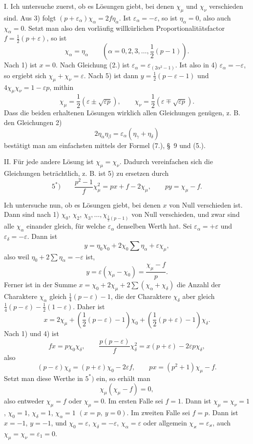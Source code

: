 \documentclass[11pt]{article}
\begin{document}
I. Ich untersuche zuerst, ob es Lösungen giebt, bei denen $\chi_\mu$ und $\chi_\nu$ verschieden sind. Aus 3) folgt $(p+\varepsilon_\alpha)\chi_\alpha=2f\eta_\alpha$. Ist $\varepsilon_\alpha=-\varepsilon$, so ist $\eta_\alpha=0$, also auch $\chi_\alpha=0$. Setzt man also den vorläufig willkürlichen Proportionalitätsfactor $f=\frac12(p+\varepsilon)$, so ist
\[
\chi_\alpha=\eta_\alpha\qquad\left(\alpha=0,2,3,\ldots,\frac12(p-1)\right).
\]
Nach 1) ist $x=0$. Nach Gleichung (2.) ist $\varepsilon_\alpha=\varepsilon_{(2\alpha^2-1)}$. Ist also in 4) $\varepsilon_\alpha=-\varepsilon$, so ergiebt sich $\chi_\mu+\chi_\nu=\varepsilon$. Nach 5) ist dann $y=\frac12(p-\varepsilon-1)$ und $4\chi_\mu\chi_\nu=1-\varepsilon p$, mithin
\[
\chi_\mu=\frac12(\varepsilon\pm\sqrt{\varepsilon p}),\qquad
\chi_\nu=\frac12(\varepsilon\mp\sqrt{\varepsilon p}).
\]
Dass die beiden erhaltenen Lösungen wirklich allen Gleichungen genügen, z. B. den Gleichungen 2)
\begin{equation*}\tag{8.}
2\eta_\alpha\eta_\beta=\varepsilon_\alpha(\eta_\gamma+\eta_\delta)
\end{equation*}
bestätigt man am einfachsten mittels der Formel (7.), \S~9 und (5.).

II. Für jede andere Lösung ist $\chi_\mu=\chi_\nu$. Dadurch vereinfachen sich die Gleichungen beträchtlich, z. B. ist 5) zu ersetzen durch
\[
5^*)\qquad
\frac{p^2-1}{f}\chi_\mu^2=px+f-2\chi_\mu,\qquad
py=\chi_\mu-f.
\]

Ich untersuche nun, ob es Lösungen giebt, bei denen $x$ von Null verschieden ist. Dann sind nach 1) $\chi_0$, $\chi_2$, $\chi_3,\ldots,\chi_{\frac12(p-1)}$ von Null verschieden, und zwar sind alle $\chi_\alpha$ einander gleich, für welche $\varepsilon_\alpha$ denselben Werth hat. Sei $\varepsilon_\alpha=+\varepsilon$ und $\varepsilon_\delta=-\varepsilon$. Dann ist
\[
y=\eta_0\chi_0+2\chi_0\sum\eta_\alpha+\varepsilon\chi_\mu,
\]
also weil $\eta_0+2\sum\eta_\alpha=-\varepsilon$ ist,
\[
y=\varepsilon(\chi_\mu-\chi_0)=\frac{\chi_\mu-f}{p}.
\]
Ferner ist in der Summe $x=\chi_0+2\chi_\mu+2\sum(\chi_\alpha+\chi_\delta)$ die Anzahl der Charaktere $\chi_\alpha$ gleich $\frac14(p-\varepsilon)-1$, die der Charaktere $\chi_\delta$ aber gleich $\frac14(p-\varepsilon)-\frac12(1-\varepsilon)$. Daher ist
\[
x=2\chi_\mu+\left(\frac12(p-\varepsilon)-1\right)\chi_0+
\left(\frac12(p+\varepsilon)-1\right)\chi_\delta.
\]
Nach 1) und 4) ist
\[
fx=p\chi_0\chi_\delta,\qquad
\frac{p(p-\varepsilon)}{f}\chi_\delta^2=x(p+\varepsilon)-2\varepsilon p\chi_\delta,
\]
also
\[
(p-\varepsilon)\chi_\delta=(p+\varepsilon)\chi_0-2\varepsilon f,\qquad
px=(p^2+1)\chi_\mu-f.
\]
Setzt man diese Werthe in $5^*)$ ein, so erhält man
\[
\chi_\mu(\chi_\mu-f)=0,
\]
also entweder $\chi_\mu=f$ oder $\chi_\mu=0$. Im ersten Falle sei $f=1$. Dann ist $\chi_\mu=\chi_\nu=1$, $\chi_0=1$, $\chi_\delta=1$, $\chi_\alpha=1$ $(x=p,\ y=0)$. Im zweiten Falle sei $f=p$. Dann ist $x=-1$, $y=-1$, und $\chi_0=\varepsilon$, $\chi_\delta=-\varepsilon$, $\chi_\alpha=\varepsilon$ oder allgemein $\chi_\varkappa=\varepsilon_\varkappa$, auch $\chi_\mu=\chi_\nu=\varepsilon_1=0$.
\end{document}
